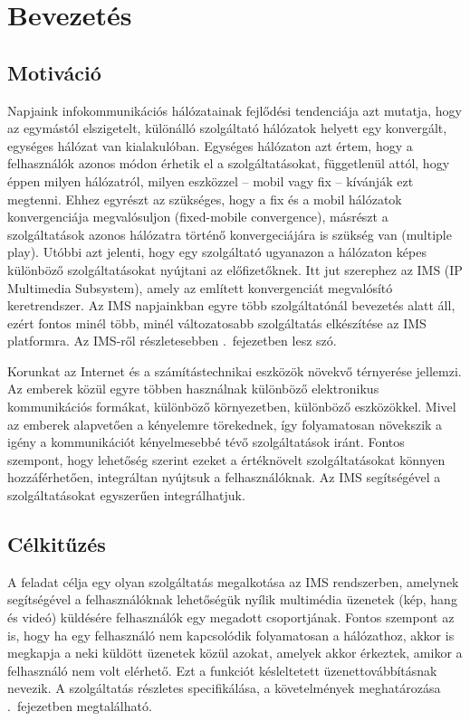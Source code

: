 
\section{Bevezetés}

\subsection{Motiváció}

Napjaink infokommunikációs hálózatainak fejlődési tendenciája azt mutatja, hogy az egymástól elszigetelt,
különálló szolgáltató hálózatok helyett egy konvergált, egységes hálózat van kialakulóban. Egységes hálózaton azt értem, hogy a felhasználók azonos módon érhetik el a szolgáltatásokat, függetlenül attól, hogy éppen milyen hálózatról, milyen eszközzel -- mobil vagy fix -- kívánják ezt megtenni. Ehhez egyrészt az szükséges, hogy a fix és a mobil hálózatok konvergenciája megvalósuljon (fixed-mobile convergence), másrészt a szolgáltatások azonos hálózatra történő konvergeciájára is szükség van (multiple play). Utóbbi azt jelenti, hogy egy szolgáltató ugyanazon a hálózaton képes különböző szolgáltatásokat nyújtani az előfizetőknek. Itt jut szerephez az IMS (IP Multimedia Subsystem), amely az említett konvergenciát megvalósító keretrendszer. Az IMS napjainkban egyre több szolgáltatónál bevezetés alatt áll, ezért fontos minél több, minél változatosabb szolgáltatás elkészítése az IMS platformra.  Az IMS-ről részletesebben .~fejezetben lesz szó.

Korunkat az Internet és a számítástechnikai eszközök növekvő térnyerése jellemzi. Az emberek közül egyre többen használnak különböző elektronikus kommunikációs formákat, különböző környezetben, különböző eszközökkel. Mivel az emberek alapvetően a kényelemre törekednek, így folyamatosan növekszik a igény a  kommunikációt kényelmesebbé tévő szolgáltatások iránt. Fontos szempont, hogy lehetőség szerint ezeket a értéknövelt szolgáltatásokat könnyen hozzáférhetően, integráltan nyújtsuk a felhasználóknak. Az IMS segítségével a szolgáltatásokat egyszerűen integrálhatjuk.

\subsection{Célkitűzés}

A feladat célja egy olyan szolgáltatás megalkotása az IMS rendszerben, amelynek
segítségével a felhasználóknak lehetőségük nyílik multimédia üzenetek (kép, hang és videó) küldésére felhasználók egy megadott csoportjának. Fontos szempont az is, hogy ha egy felhasználó nem kapcsolódik folyamatosan a hálózathoz, akkor is megkapja a neki küldött üzenetek közül azokat, amelyek akkor érkeztek, amikor a felhasználó nem volt elérhető. Ezt a funkciót késleltetett üzenettovábbításnak nevezik. A szolgáltatás részletes specifikálása, a követelmények meghatározása .~fejezetben megtalálható.


